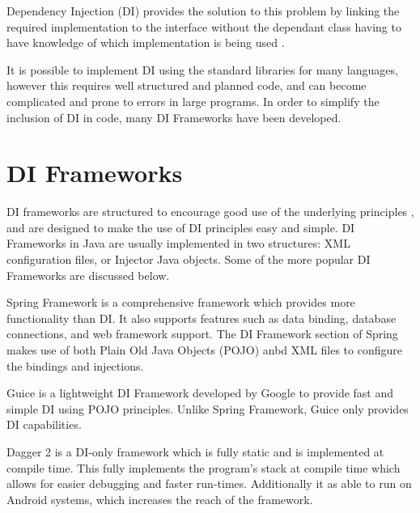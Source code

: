 \documentclass[12pt,twocolumn]{IEEEtran}
\begin{document}
Dependency Injection (DI) provides the solution to this problem by linking the required implementation to the interface without the dependant class having to have knowledge of which implementation is being used \cite{tonymarston2016,hongyulyangewantemperohaydenmelton2008}. 

It is possible to implement DI using the standard libraries for many languages, however this requires well structured and planned code, and can become complicated and prone to errors in large programs. In order to simplify the inclusion of DI in code, many DI Frameworks have been developed.

\section{DI Frameworks}

DI frameworks are structured to encourage good use of the underlying principles \cite{rodjohnson2005,dennisdoomen2018}, and are designed to make the use of DI principles easy and simple. DI Frameworks in Java are usually implemented in two structures: XML configuration files, or Injector Java objects. Some of the more popular DI Frameworks are discussed below.

Spring Framework is a comprehensive framework which provides more functionality than DI. It also supports features such as data binding, database connections, and web framework support. The DI Framework section of Spring makes use of both Plain Old Java Objects (POJO) anbd XML files to configure the bindings and injections.

Guice is a lightweight DI Framework developed by Google to provide fast and simple DI using POJO principles. Unlike Spring Framework, Guice only provides DI capabilities.

Dagger 2 is a DI-only framework which is fully static and is implemented at compile time. This fully implements the program's stack at compile time which allows for easier debugging and faster run-times. Additionally it as able to run on Android systems, which increases the reach of the framework.
\end{document}
